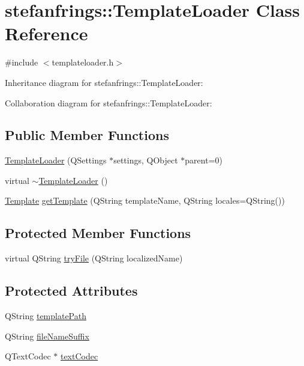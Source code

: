 \hypertarget{classstefanfrings_1_1_template_loader}{}\section{stefanfrings\+:\+:Template\+Loader Class Reference}
\label{classstefanfrings_1_1_template_loader}


{\ttfamily \#include $<$templateloader.\+h$>$}



Inheritance diagram for stefanfrings\+:\+:Template\+Loader\+:


Collaboration diagram for stefanfrings\+:\+:Template\+Loader\+:
\subsection*{Public Member Functions}
\begin{DoxyCompactItemize}
\item 
\mbox{\hyperlink{classstefanfrings_1_1_template_loader_a826a8afe9a89d7635183320f3891e66f}{Template\+Loader}} (Q\+Settings $\ast$settings, Q\+Object $\ast$parent=0)
\item 
virtual \mbox{\hyperlink{classstefanfrings_1_1_template_loader_a6914af0af09bc3f0e00f373c23e79382}{$\sim$\+Template\+Loader}} ()
\item 
\mbox{\hyperlink{classstefanfrings_1_1_template}{Template}} \mbox{\hyperlink{classstefanfrings_1_1_template_loader_ae8639b349ec9c9a01ec82ea1ed8d0af8}{get\+Template}} (Q\+String template\+Name, Q\+String locales=Q\+String())
\end{DoxyCompactItemize}
\subsection*{Protected Member Functions}
\begin{DoxyCompactItemize}
\item 
virtual Q\+String \mbox{\hyperlink{classstefanfrings_1_1_template_loader_a006cbda0c014ad08199563ea56fc05a3}{try\+File}} (Q\+String localized\+Name)
\end{DoxyCompactItemize}
\subsection*{Protected Attributes}
\begin{DoxyCompactItemize}
\item 
Q\+String \mbox{\hyperlink{classstefanfrings_1_1_template_loader_aee91532454f736858307239c48c69523}{template\+Path}}
\item 
Q\+String \mbox{\hyperlink{classstefanfrings_1_1_template_loader_a08d5758493b8e26f42f72799fed1caac}{file\+Name\+Suffix}}
\item 
Q\+Text\+Codec $\ast$ \mbox{\hyperlink{classstefanfrings_1_1_template_loader_a2cb81190ac3993fda6e20e65713bfcce}{text\+Codec}}
\end{DoxyCompactItemize}


